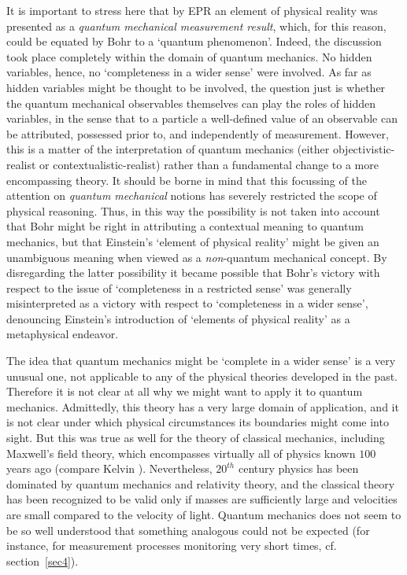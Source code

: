 \documentclass[12pt]{article}
\begin{document}
It is important to stress here that by EPR an element of physical
reality was presented as a {\em quantum mechanical measurement
result}, which, for this reason, could be equated by Bohr to a
`quantum phenomenon'. Indeed, the discussion took place completely
within the domain of quantum mechanics. No hidden variables,
hence, no `completeness in a wider sense' were involved. As far as
hidden variables might be thought to be involved, the question
just is whether the quantum mechanical observables themselves can
play the roles of hidden variables, in the sense that to a
particle a well-defined value of an observable can be attributed,
possessed prior to, and independently of measurement. However,
this is a matter of the interpretation of quantum mechanics
(either objectivistic-realist or contextualistic-realist) rather
than a fundamental change to a more encompassing theory. It should
be borne in mind that this focussing of the attention on {\em
quantum mechanical} notions has severely restricted the scope of
physical reasoning. Thus, in this way the possibility is not taken
into account that Bohr might be right in attributing a contextual
meaning to quantum mechanics, but that Einstein's `element of
physical reality' might be given an unambiguous meaning when
viewed as a {\em non}-quantum mechanical concept. By disregarding
the latter possibility it became possible that Bohr's victory with
respect to the issue of `completeness in a restricted sense' was
generally misinterpreted as a victory with respect to
`completeness in a wider sense', denouncing Einstein's
introduction of `elements of physical reality' as a metaphysical
endeavor.

The idea that quantum mechanics might be `complete in a wider
sense' is a very unusual one, not applicable to any of the
physical theories developed in the past. Therefore it is not clear
at all why we might want to apply it to quantum mechanics.
Admittedly, this theory has a very large domain of application,
and it is not clear under which physical circumstances its
boundaries might come into sight. But this was true as well for
the theory of classical mechanics, including Maxwell's field
theory, which encompasses virtually all of physics known $100$
years ago (compare Kelvin \cite{Kel}). Nevertheless, $20^{th}$
century physics has been dominated by quantum mechanics and
relativity theory, and the classical theory has been recognized to
be valid only if masses are sufficiently large and velocities are
small compared to the velocity of light. Quantum mechanics does
not seem to be so well understood that something analogous could
not be expected (for instance, for measurement processes
monitoring very short times, cf. section~\ref{sec4}).
\end{document}
